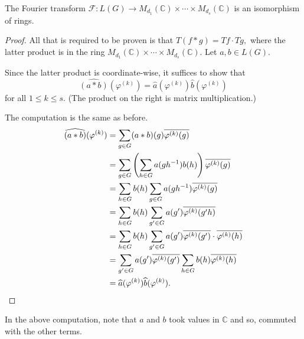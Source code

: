 \documentclass[12pt]{article}	%
\begin{document}
\begin{thm}[Wedderburn]
    The Fourier transform $\mathcal{F} : L(G) \to M_{d_1}(\mathbb{C}) \times \cdots \times M_{d_s}(\mathbb{C})$ is an isomorphism of rings.
\end{thm}
\begin{proof} 
    All that is required to be proven is that $T(f * g) = Tf \cdot Tg,$ where the latter product is in the ring $M_{d_1}(\mathbb{C}) \times \cdots \times M_{d_s}(\mathbb{C}).$ Let $a, b \in L(G).$

    Since the latter product is coordinate-wise, it suffices to show that
    \begin{equation*} 
        \widehat{(a * b)}(\varphi^{(k)}) = \widehat{a}(\varphi^{(k)})\widehat{b}(\varphi^{(k)})
    \end{equation*}
    for all $1 \le k \le s.$ (The product on the right is matrix multiplication.)

    The computation is the same as before.
    \begin{align*} 
        \widehat{(a * b)}(\varphi^{(k)}) &= \sum_{g \in G} (a * b)(g)\overline{\varphi^{(k)}(g)}\\
        &= \sum_{g \in G}\left(\sum_{h \in G}a(gh^{-1})b(h)\right)\overline{\varphi^{(k)}(g)}\\
        &= \sum_{h \in G}b(h)\sum_{g \in G}a(gh^{-1})\overline{\varphi^{(k)}(g)}\\
        &= \sum_{h \in G}b(h)\sum_{g' \in G}a(g')\overline{\varphi^{(k)}(g'h)}\\
        &= \sum_{h \in G}b(h)\sum_{g' \in G}a(g')\overline{\varphi^{(k)}(g')}\cdot\overline{\varphi^{(k)}(h)}\\
        &= \sum_{g' \in G}a(g')\overline{\varphi^{(k)}(g')}\sum_{h \in G}b(h)\overline{\varphi^{(k)}(h)}\\
        &= \widehat{a}(\varphi^{(k)})\widehat{b}(\varphi^{(k)}). \qedhere
    \end{align*}
\end{proof}
In the above computation, note that $a$ and $b$ took values in $\mathbb{C}$ and so, commuted with the other terms.

\newpage
\renewcommand*{\listtheoremname}{List of Examples}
\listoftheorems[ignoreall,show={fakeex}]
\end{document}
